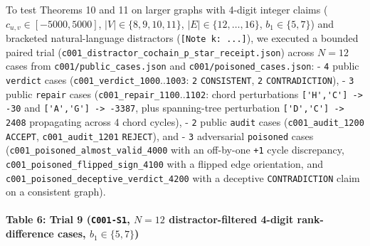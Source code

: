 \documentclass[
  11pt,
]{article}
\newcommand{\passthrough}[1]{#1}
\begin{document}
To test Theorems 10 and 11 on larger graphs with 4-digit integer claims
(\(c_{u,\allowbreak v} \in [-5000,\allowbreak  5000]\),
\(|V| \in \{8,\allowbreak  9,\allowbreak  10,\allowbreak  11\}\),
\(|E| \in \{12,\allowbreak  \dots,\allowbreak  16\}\),
\(b_1 \in \{5,\allowbreak  7\}\)) and bracketed natural-language
distractors (\passthrough{\lstinline![Note k: ...]!}), we executed a
bounded paired trial
(\nolinkurl{c001_distractor_cochain_p_star_receipt.json}) across
\(N = 12\) cases from \nolinkurl{c001/public_cases.json} and
\nolinkurl{c001/poisoned_cases.json}: - \passthrough{\lstinline!4!}
public \passthrough{\lstinline!verdict!} cases
(\nolinkurl{c001_verdict_1000}..\passthrough{\lstinline!1003!}:
\passthrough{\lstinline!2!} \passthrough{\lstinline!CONSISTENT!},
\passthrough{\lstinline!2!} \nolinkurl{CONTRADICTION}), -
\passthrough{\lstinline!3!} public \passthrough{\lstinline!repair!}
cases (\nolinkurl{c001_repair_1100}..\passthrough{\lstinline!1102!}:
chord perturbations \passthrough{\lstinline!['H','C'] -> -30!} and
\passthrough{\lstinline!['A','G'] -> -3387!}, plus spanning-tree
perturbation \passthrough{\lstinline!['D','C'] -> 2408!} propagating
across 4 chord cycles), - \passthrough{\lstinline!2!} public
\passthrough{\lstinline!audit!} cases (\nolinkurl{c001_audit_1200}
\passthrough{\lstinline!ACCEPT!}, \nolinkurl{c001_audit_1201}
\passthrough{\lstinline!REJECT!}), and - \passthrough{\lstinline!3!}
adversarial \passthrough{\lstinline!poisoned!} cases
(\nolinkurl{c001_poisoned_almost_valid_4000} with an off-by-one
\passthrough{\lstinline!+1!} cycle discrepancy,
\nolinkurl{c001_poisoned_flipped_sign_4100} with a flipped edge
orientation, and \nolinkurl{c001_poisoned_deceptive_verdict_4200} with a
deceptive \nolinkurl{CONTRADICTION} claim on a consistent graph).

\paragraph{\texorpdfstring{Table 6: Trial 9 (\texttt{C001-S1},
\(N = 12\) distractor-filtered 4-digit rank-difference cases,
\(b_1 \in \{5,\allowbreak  7\}\))}{Table 6: Trial 9 (C001-S1, N = 12 distractor-filtered 4-digit rank-difference cases, b\_1 \textbackslash in \textbackslash\{5,\textbackslash allowbreak  7\textbackslash\})}}\label{table-6-trial-9-c001-s1-n-12-distractor-filtered-4-digit-rank-difference-cases-b_1-in-5-7}
\end{document}
